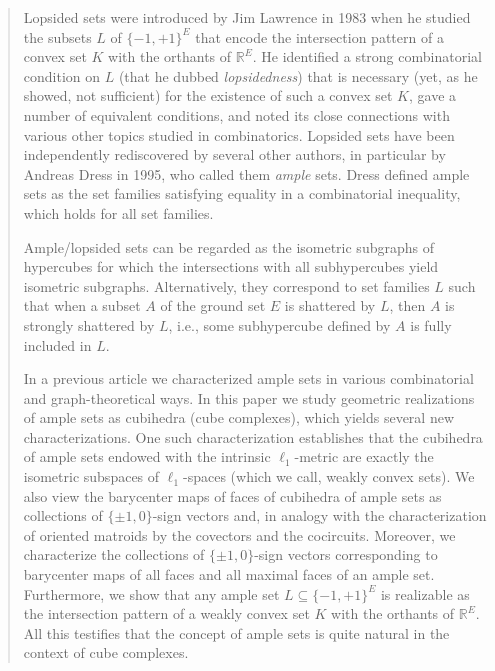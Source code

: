 \documentclass[11pt,a4paper]{amsart}
\theoremstyle{definition}
\numberwithin{equation}{section}
\newcommand{\covectors}{\ensuremath{L}}
\begin{document}
\begin{abstract} Lopsided sets were introduced by Jim Lawrence in 1983 when he studied the
subsets $\covectors$ of   $\{-1,+1\}^E$ that encode the intersection
pattern of a convex set $K$  with the orthants of  ${\mathbb R}^E$.
He identified a strong combinatorial condition  on
$\covectors$ (that he dubbed \emph{lopsidedness}) that is necessary (yet, as he showed, not sufficient) for the existence of such a convex set $K$, gave a number of equivalent conditions, and noted its close connections with various other topics studied in combinatorics. Lopsided sets have been independently rediscovered by several other authors, in particular by Andreas Dress in 1995, who called them \emph{ample} sets. Dress defined  ample sets as the set families satisfying equality in a combinatorial inequality, which holds for all set families.

Ample/lopsided sets can be regarded as the isometric subgraphs of  hypercubes for which the intersections with all subhypercubes yield isometric subgraphs.  Alternatively, they correspond to set families $\covectors$ such that when a subset $A$ of the ground set $E$ is shattered by $\covectors$, then $A$ is strongly shattered by $\covectors$, i.e., some subhypercube defined by $A$ is fully included in $\covectors$.

 In a previous article we characterized ample sets in various combinatorial and graph-theoretical ways. In this paper we study geometric realizations of ample sets as cubihedra (cube complexes), which yields several new characterizations. %
One such characterization establishes that the cubihedra of ample sets endowed with the intrinsic $\ell_1$-metric are exactly the isometric subspaces of $\ell_1$-spaces (which we call, weakly convex sets). We also view the barycenter maps of faces of cubihedra of ample sets as collections of $\{ \pm 1, 0\}$-sign vectors and, in analogy with the characterization  of oriented matroids by the covectors and the cocircuits. Moreover, we characterize the  collections of $\{ \pm 1, 0\}$-sign vectors corresponding to barycenter maps of all faces and all maximal faces of an ample set.  Furthermore, we show that any ample set $\covectors\subseteq \{ -1,+1\}^E$  is realizable as the intersection pattern of a weakly convex set $K$ with the orthants of ${\mathbb R}^E$.
All this testifies that the concept of ample sets is quite natural in the context of cube complexes.
\end{abstract}
\end{document}
